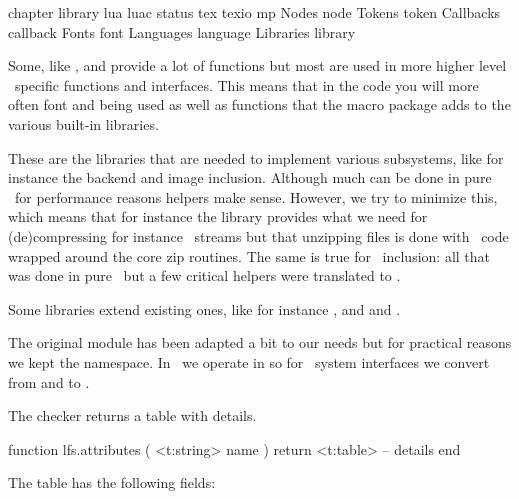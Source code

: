 \starttabulate[|l|Tl|]
\FL
\BC chapter   \BC library          \NC \NR
\TL
\NC \LUA      \NC lua luac         \NC \NR
\NC \TEX      \NC status tex texio \NC \NR
\NC \METAPOST \NC mp               \NC \NR
\NC Nodes     \NC node             \NC \NR
\NC Tokens    \NC token            \NC \NR
\NC Callbacks \NC callback         \NC \NR
\NC Fonts     \NC font             \NC \NR
\NC Languages \NC language         \NC \NR
\NC Libraries \NC library          \NC \NR
\LL
\stoptabulate

Some, like ,  and  provide a lot of functions
but most are used in more higher level \CONTEXT\ specific functions and
interfaces. This means that in the code you will more often font 
and  being used as well as functions that the macro package adds to
the various built-in libraries.

\stopsection

\startsection[title={Auxiliary}]

\startsubsection[title=Extensions]

These are the libraries that are needed to implement various subsystems, like for
instance the backend and image inclusion. Although much can be done in pure \LUA\
for performance reasons helpers make sense. However, we try to minimize this,
which means that for instance the \type {zip} library provides what we need for
(de)compressing for instance \PDF\ streams but that unzipping files is done with
\LUA\ code wrapped around the core zip routines. The same is true for \PNG\
inclusion: all that was done in pure \LUA\ but a few critical helpers were
translated to \CCODE.

Some libraries extend existing ones, like for instance , 
and  and .

\stopsubsection

\startsubsection[title=Extra file helpers]

The original  module has been adapted a bit to our needs but for
practical reasons we kept the namespace. In \LUAMETATEX\ we operate in 
so for \MSWINDOWS\ system interfaces we convert from and to \UNICODE16.

The \type {attributes} checker returns a table with details.

\starttyping[option=LUA]
function lfs.attributes ( <t:string> name )
    return <t:table> -- details
end
\stoptyping

The table has the following fields:

